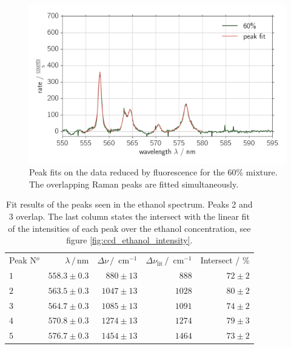 \begin{figure}[htpb]
    \centering
    \includegraphics[width=0.8\linewidth]{analysis/figures/ccd_ethanol_peak_fits}
    \caption{
        Peak fits on the data reduced by fluorescence for the 60\% mixture. The overlapping Raman peaks 
        are fitted simultaneously. 
        }
    \label{fig:ccd_ethanol_peak_fits}
\end{figure}


\begin{table}[htpb]
    \centering
    \caption{
        Fit results of the peaks seen in the ethanol spectrum. Peaks 2 and 3 overlap. The last 
        column states the intersect with the linear fit of the intensities of each peak over 
    the ethanol concentration, see figure \ref{fig:ccd_ethanol_intensity}.
        }
    \label{tab:ccd_ethanol_peaks}
    \begin{tabular}{l r r r r}
        \rowcolor{LightCyan} Peak N$^o$ & $\lambda \, / \, \text{nm}$ &
        $\Delta \nu \, / \, \text{ cm}^{-1}$ & 
        $\Delta \nu_\text{lit} \, / \, \text{ cm}^{-1}$ &
        Intersect / \% \\
        \cellcolor{LightCyan}$1$ & $558.3 \pm 0.3$ & $880 \pm 13$ & $888$ & $72 \pm 2$  \\
        \cellcolor{LightCyan}$2$ & $563.5 \pm 0.3$ & $1047 \pm 13$ & $1028$ & $80 \pm 2$  \\
        \cellcolor{LightCyan}$3$ & $564.7 \pm 0.3$ & $1085 \pm 13$ & $1091$ & $74 \pm 2$  \\
        \cellcolor{LightCyan}$4$ & $570.8 \pm 0.3$ & $1274 \pm 13$ & $1274$ & $79 \pm 3$  \\
        \cellcolor{LightCyan}$5$ & $576.7 \pm 0.3$ & $1454 \pm 13$ & $1464$ & $73 \pm 2$  
    \end{tabular}
\end{table}

